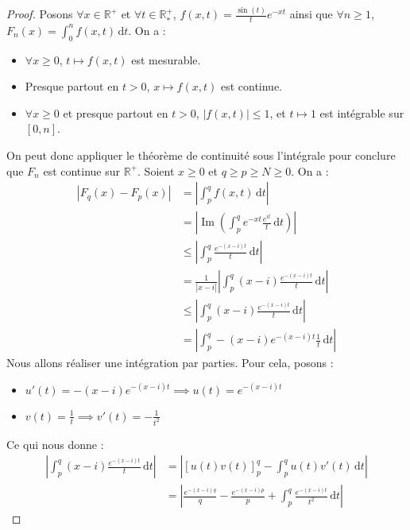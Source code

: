   \begin{proof}
    Posons $\forall x \in \mathbb{R}^+$ et $\forall t \in \mathbb{R}^+_*$, $f(x,t) = \frac{\sin(t)}{t} e^{-xt}$ ainsi que $\forall n \geq 1$, $F_n(x) = \int_0^n f(x,t) \, \mathrm{d}t$. On a :
    \begin{itemize}
      \item $\forall x \geq 0$, $t \mapsto f(x, t)$ est mesurable.
      \item Presque partout en $t > 0$, $x \mapsto f(x, t)$ est continue.
      \item $\forall x \geq 0$ et presque partout en $t > 0$, $|f(x,t)| \leq 1$, et $t \mapsto 1$ est intégrable sur $[0,n]$.
    \end{itemize}
    On peut donc appliquer le théorème de continuité sous l'intégrale pour conclure que $F_n$ est continue sur $\mathbb{R}^+$.
    \newpar
    Soient $x \geq 0$ et $q \geq p \geq N \geq 0$. On a :
    \begin{align*}
      |F_q(x) - F_p(x)| &= \left| \int_p^q f(x,t) \, \mathrm{d}t \right| \\
      &= \left| \operatorname{Im} \left( \int_p^q e^{-xt} \frac{e^{it}}{t} \, \mathrm{d}t \right) \right| \\
      &\leq \left| \int_p^q \frac{e^{-(x-i)t}}{t} \, \mathrm{d}t \right| \\
      &= \frac{1}{|x-i|} \left| \int_p^q (x-i) \frac{e^{-(x-i)t}}{t} \, \mathrm{d}t \right| \\
      &\leq \left| \int_p^q (x-i) \frac{e^{-(x-i)t}}{t} \, \mathrm{d}t \right| \\
      &= \left| \int_p^q -(x-i) e^{-(x-i)t} \frac{1}{t} \, \mathrm{d}t \right|
    \end{align*}
    Nous allons réaliser une intégration par parties. Pour cela, posons :
    \begin{itemize}
      \item $u'(t) = -(x-i) e^{-(x-i)t} \implies u(t) = e^{-(x-i)t}$
      \item $v(t) = \frac{1}{t} \implies v'(t) = -\frac{1}{t^2}$
    \end{itemize}
    Ce qui nous donne :
    \begin{align*}
      \left| \int_p^q (x-i) \frac{e^{-(x-i)t}}{t} \, \mathrm{d}t \right| &= \left| \left[ u(t)v(t) \right]_p^q - \int_p^q u(t) v'(t) \, \mathrm{d}t \right| \\
      &= \left| \frac{e^{-(x-i)q}}{q} - \frac{e^{-(x-i)p}}{p} +  \int_p^q \frac{e^{-(x-i)t}}{t^2} \, \mathrm{d}t \right|
    \end{align*}

\end{proof}
